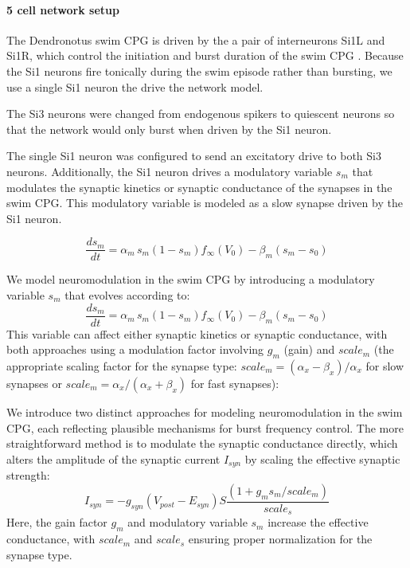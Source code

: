 \documentclass[nofootinbib,aip,amsmath,amssymb,reprint,twocolumn,10pt]{revtex4-2}
\begin{document}
\paragraph{5 cell network setup}
The Dendronotus swim CPG is driven by the a pair of interneurons Si1L and Si1R, which control the initiation and burst duration of the swim CPG \cite{sakurai2019command} \cite{SakuraiKatz2016}. Because the Si1 neurons fire tonically during the swim episode rather than bursting, we use a single Si1 neuron the drive the network model.

The Si3 neurons were changed from endogenous spikers to quiescent neurons so that the network would only burst when driven by the Si1 neuron.

The single Si1 neuron was configured to send an excitatory drive to both Si3 neurons.
Additionally, the Si1 neuron drives a modulatory variable $s_m$ that modulates the synaptic kinetics or synaptic conductance of the synapses in the swim CPG. This modulatory variable is modeled as a slow synapse driven by the Si1 neuron. 

\begin{equation}
\frac{ds_m}{dt} = \alpha_m\, s_m (1 - s_m) f_{\infty}(V_0) - \beta_m (s_m - s_0)
\end{equation}

We model neuromodulation in the swim CPG by introducing a modulatory variable $s_m$ that evolves according to:
\begin{equation}
\frac{ds_m}{dt} = \alpha_m\, s_m (1 - s_m) f_{\infty}(V_0) - \beta_m (s_m - s_0)
\end{equation}
This variable can affect either synaptic kinetics or synaptic conductance, with both approaches using a modulation factor involving $g_m$ (gain) and $scale_m$ (the appropriate scaling factor for the synapse type: $scale_m = (\alpha_x - \beta_x)/\alpha_x$ for slow synapses or $scale_m = \alpha_x/(\alpha_x + \beta_x)$ for fast synapses):

We introduce two distinct approaches for modeling neuromodulation in the swim CPG, each reflecting plausible mechanisms for burst frequency control. The more straightforward method is to modulate the synaptic conductance directly, which alters the amplitude of the synaptic current $I_{syn}$ by scaling the effective synaptic strength:
\begin{equation}
I_{syn} = -g_{syn}(V_{post}-E_{syn})S\frac{(1+g_m s_m/scale_m)}{scale_s}
\end{equation}
Here, the gain factor $g_m$ and modulatory variable $s_m$ increase the effective conductance, with $scale_m$ and $scale_s$ ensuring proper normalization for the synapse type.
\end{document}
